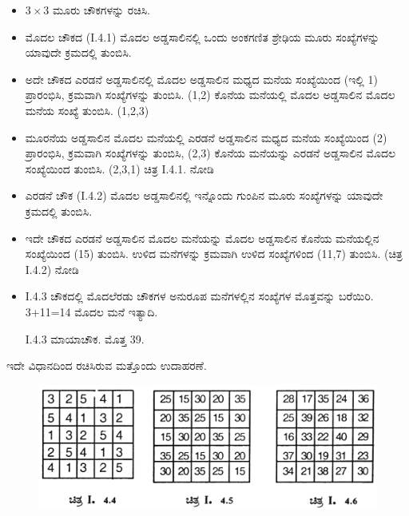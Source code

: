 \begin{itemize}
	\item $3 \times 3$ ಮೂರು ಚೌಕಗಳನ್ನು ರಚಿಸಿ.
	\item ಮೊದಲ ಚೌಕದ (I.4.1) ಮೊದಲ ಅಡ್ಡಸಾಲಿನಲ್ಲಿ ಒಂದು ಅಂಕಗಣಿತ ಶ್ರೇಢಿಯ ಮೂರು ಸಂಖ್ಯೆಗಳನ್ನು ಯಾವುದೇ ಕ್ರಮದಲ್ಲಿ ತುಂಬಿಸಿ.
	\item ಅದೇ ಚೌಕದ ಎರಡನೆ ಅಡ್ಡಸಾಲಿನಲ್ಲಿ ಮೊದಲ ಅಡ್ಡಸಾಲಿನ ಮಧ್ಯದ ಮನೆಯ \break ಸಂಖ್ಯೆಯಿಂದ (ಇಲ್ಲಿ 1) ಪ್ರಾರಂಭಿಸಿ, ಕ್ರಮವಾಗಿ ಸಂಖ್ಯೆಗಳನ್ನು ತುಂಬಿಸಿ. (1,2) ಕೊನೆಯ ಮನೆಯಲ್ಲಿ ಮೊದಲ ಅಡ್ಡಸಾಲಿನ ಮೊದಲ ಮನೆಯ ಸಂಖ್ಯೆ ತುಂಬಿಸಿ. (1,2,3)
	\item ಮೂರನೆಯ ಅಡ್ಡಸಾಲಿನ ಮೊದಲ ಮನೆಯಲ್ಲಿ ಎರಡನೆ ಅಡ್ಡಸಾಲಿನ ಮಧ್ಯದ ಮನೆಯ ಸಂಖ್ಯೆಯಿಂದ (2) ಪ್ರಾರಂಭಿಸಿ, ಕ್ರಮವಾಗಿ ಸಂಖ್ಯೆಗಳನ್ನು ತುಂಬಿಸಿ, (2,3) ಕೊನೆಯ ಮನೆಯನ್ನು ಎರಡನೆ ಅಡ್ಡಸಾಲಿನ ಮೊದಲ ಸಂಖ್ಯೆಯಿಂದ \break ತುಂಬಿಸಿ. (2,3,1) ಚಿತ್ರ I.4.1. ನೋಡಿ
	\item ಎರಡನೆ ಚೌಕ (I.4.2) ಮೊದಲ ಅಡ್ಡಸಾಲಿನಲ್ಲಿ ಇನ್ನೊಂದು ಗುಂಪಿನ ಮೂರು \break ಸಂಖ್ಯೆಗಳನ್ನು ಯಾವುದೇ ಕ್ರಮದಲ್ಲಿ ತುಂಬಿಸಿ.
	\item ಇದೇ ಚೌಕದ ಎರಡನೆ ಅಡ್ಡಸಾಲಿನ ಮೊದಲ ಮನೆಯನ್ನು ಮೊದಲ ಅಡ್ಡಸಾಲಿನ \break ಕೊನೆಯ ಮನೆಯಲ್ಲಿನ ಸಂಖ್ಯೆಯಿಂದ (15) ತುಂಬಿಸಿ. ಉಳಿದ ಮನೆಗಳನ್ನು ಕ್ರಮವಾಗಿ ಉಳಿದ ಸಂಖ್ಯೆಗಳಿಂದ (11,7) ತುಂಬಿಸಿ. (ಚಿತ್ರ I.4.2) ನೋಡಿ
	\item I.4.3 ಚೌಕದಲ್ಲಿ ಮೊದಲೆರಡು ಚೌಕಗಳ ಅನುರೂಪ ಮನೆಗಳಲ್ಲಿನ ಸಂಖ್ಯೆಗಳ \break ಮೊತ್ತವನ್ನು ಬರೆಯಿರಿ. 3+11=14 ಮೊದಲ ಮನೆ ಇತ್ಯಾದಿ.

	I.4.3 ಮಾಯಾಚೌಕ. ಮೊತ್ತ 39.
\end{itemize}

	ಇದೇ ವಿಧಾನದಿಂದ ರಚಿಸಿರುವ ಮತ್ತೊಂದು ಉದಾಹರಣೆ.
	\begin{figure}[H]
	\includegraphics[scale=.9]{src/figures/chap3/fig3-10.jpg}
	\end{figure}

